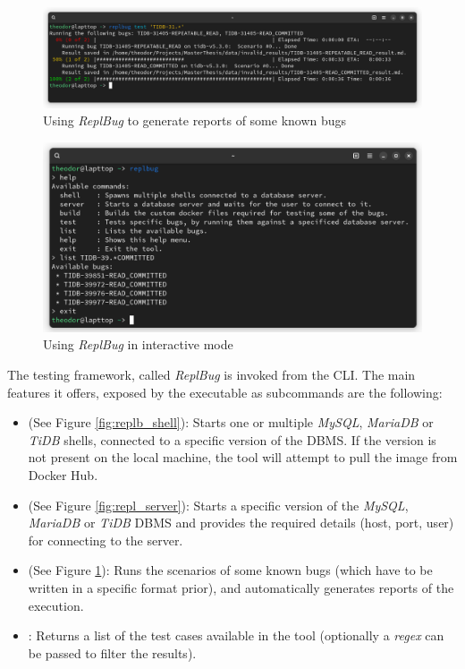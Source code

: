 \begin{figure}
    \centering
    \includegraphics[width=\linewidth]{assets/replbug_test.png}
    \caption{Using \textit{ReplBug} to generate reports of some known bugs}
    \label{fig:repl_test}
\end{figure}


\begin{figure}
    \centering
    \includegraphics[width=\linewidth]{assets/replbug_interactive.png}
    \caption{Using \textit{ReplBug} in interactive mode}
    \label{fig:repl_interactive}
\end{figure}




The testing framework, called \textit{ReplBug} is invoked from the CLI. The main features it offers, exposed by the executable as subcommands are the following:
\begin{itemize}
    \item \textbf{} (See Figure \ref{fig:replb_shell}): Starts one or multiple \textit{MySQL}, \textit{MariaDB} or \textit{TiDB} shells, connected to a specific version of the DBMS. If the version is not present on the local machine, the tool will attempt to pull the image from Docker Hub.
    \item \textbf{} (See Figure \ref{fig:repl_server}): Starts a specific version of the \textit{MySQL}, \textit{MariaDB} or \textit{TiDB} DBMS and provides the required details (host, port, user) for connecting to the server.
    \item \textbf{} (See Figure \ref{fig:repl_test}): Runs the scenarios of some known bugs (which have to be written in a specific format prior), and automatically generates reports of the execution.
    \item \textbf{}: Returns a list of the test cases available in the tool (optionally a \textit{regex} can be passed to filter the results).
\end{itemize}

